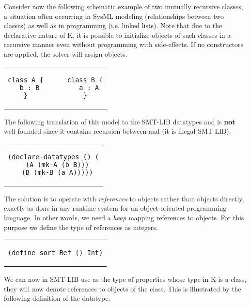 Consider now the following schematic example of two mutually recursive
classes, a situation often occurring in SysML modeling (relationships
between two classes) as well as in programming (i.e. linked lists).
Note that due to the declarative nature of K, it is possible to initialize
objects of such classes in a recursive manner even without programming with side-effects.
If no constructors are applied, the solver will assign objects.

\lstset{language=K,numbers=none}

\begin{center}
\begin{tabular}{c}
\begin{lstlisting}
class A {      class B {
  b : B          a : A
}              }
\end{lstlisting}
\end{tabular}
\end{center}

\noindent The following translation of this model to the SMT-LIB datatypes
 and  is {\bf not} well-founded since it contains
recursion between  and  (it is illegal SMT-LIB).

\lstset{language=SMT,numbers=none}

\begin{center}
\begin{tabular}{c}
\begin{lstlisting}
(declare-datatypes () (
  (A (mk-A (b B)))
  (B (mk-B (a A)))))
\end{lstlisting}
\end{tabular}
\end{center}

\noindent The solution is to operate with {\em references} to objects rather
than objects directly, exactly as done in any runtime system for an
object-oriented programming language. In other words, we need a {\em
  heap} mapping references to objects. For this purpose we define
the type of references as integers.

\begin{center}
\begin{tabular}{c}
\begin{lstlisting}
(define-sort Ref () Int)
\end{lstlisting}
\end{tabular}
\end{center}

\noindent We can now in SMT-LIB use  as the type of properties whose 
type in K is a class, they will now denote references to objects of the class.
This is illustrated by the following definition of the  datatype.

